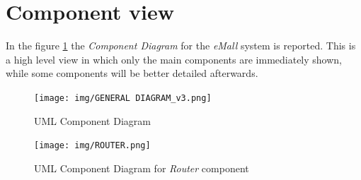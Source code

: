 \documentclass[a4paper]{report}
\begin{document}
\section{Component view}
In the figure \ref{fig:general-component-diagram} the \textit{Component Diagram} for the \textit{eMall} system is reported. This is a high level view in which only the main components are immediately shown, while some components will be better detailed afterwards.

\begin{figure}[hp]
\centering
\texttt{[image: img/GENERAL DIAGRAM\_v3.png]}
\caption{UML Component Diagram}
\label{fig:general-component-diagram}
\end{figure}


\begin{figure}[hp]
\centering
\texttt{[image: img/ROUTER.png]}
\caption{UML Component Diagram for \textit{Router} component}
\label{fig:router-component}
\end{figure}
\end{document}
